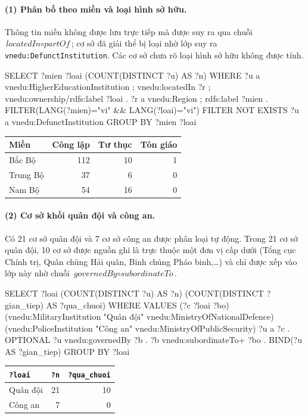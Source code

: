 \documentclass[12pt,a4paper]{article}
\newcommand{\vn}[1]{\texttt{vnedu:\allowbreak #1}}
\begin{document}
\paragraph{(1) Phân bố theo miền và loại hình sở hữu.} Thông tin miền không được lưu trực tiếp mà được suy ra qua chuỗi
\(\textit{locatedIn}\circ\textit{partOf}\); cơ sở đã giải thể bị loại nhờ lớp suy ra \vn{DefunctInstitution}. Các cơ sở
chưa rõ loại hình sở hữu không được tính.
\begin{code}
SELECT ?mien ?loai (COUNT(DISTINCT ?u) AS ?n) WHERE {
  ?u a vnedu:HigherEducationInstitution ; vnedu:locatedIn ?r ;
     vnedu:ownership/rdfs:label ?loai .
  ?r a vnedu:Region ; rdfs:label ?mien .
  FILTER(LANG(?mien)="vi" && LANG(?loai)="vi")
  FILTER NOT EXISTS { ?u a vnedu:DefunctInstitution }
} GROUP BY ?mien ?loai
\end{code}
\begin{center}\small
\begin{tabular}{lrrr}
\toprule
Miền & Công lập & Tư thục & Tôn giáo \\
\midrule
Bắc Bộ & 112 & 10 & 1 \\
Trung Bộ & 37 & 6 & 0 \\
Nam Bộ & 54 & 16 & 0 \\
\bottomrule
\end{tabular}
\end{center}

\paragraph{(2) Cơ sở khối quân đội và công an.} Có 21 cơ sở quân đội và 7 cơ sở công an được phân loại tự động. Trong
21 cơ sở quân đội, 10 cơ sở được nguồn ghi là trực thuộc một đơn vị cấp dưới (Tổng cục Chính trị, Quân chủng Hải quân,
Binh chủng Pháo binh,\dots) và chỉ được xếp vào lớp này nhờ chuỗi \(\textit{governedBy}\circ\textit{subordinateTo}\).
\begin{code}
SELECT ?loai (COUNT(DISTINCT ?u) AS ?n)
       (COUNT(DISTINCT ?gian_tiep) AS ?qua_chuoi)
WHERE {
  VALUES (?c ?loai ?bo) {
    (vnedu:MilitaryInstitution "Quân đội" vnedu:MinistryOfNationalDefence)
    (vnedu:PoliceInstitution   "Công an"  vnedu:MinistryOfPublicSecurity) }
  ?u a ?c .
  OPTIONAL { ?u vnedu:governedBy ?b .
             ?b vnedu:subordinateTo+ ?bo .
             BIND(?u AS ?gian_tiep) }
} GROUP BY ?loai
\end{code}
\begin{center}\small
\begin{tabular}{lrr}
\toprule
\texttt{?loai} & \texttt{?n} & \texttt{?qua\_chuoi} \\
\midrule
Quân đội & 21 & 10 \\
Công an & 7 & 0 \\
\bottomrule
\end{tabular}
\end{center}
\end{document}
